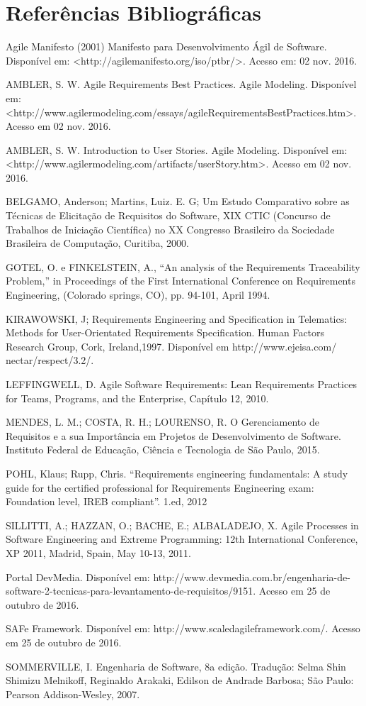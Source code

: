 \chapter[Referências Bibliográficas]{Referências Bibliográficas}

Agile Manifesto (2001) Manifesto para Desenvolvimento Ágil de Software. Disponível em: <http://agilemanifesto.org/iso/ptbr/>. Acesso em: 02 nov. 2016.

AMBLER, S. W. Agile Requirements Best Practices. Agile Modeling. Disponível em: <http://www.agilermodeling.com/essays/agileRequirementsBestPractices.htm>. Acesso em 02 nov. 2016.

AMBLER, S. W. Introduction to User Stories. Agile Modeling. Disponível em: <http://www.agilermodeling.com/artifacts/userStory.htm>. Acesso em 02 nov. 2016.

BELGAMO, Anderson; Martins, Luiz. E. G; Um Estudo Comparativo sobre as Técnicas de Elicitação de Requisitos do Software, XIX CTIC (Concurso de Trabalhos de Iniciação Científica) no XX Congresso Brasileiro da Sociedade Brasileira de Computação, Curitiba, 2000.

GOTEL, O. e FINKELSTEIN, A., “An analysis of the Requirements Traceability Problem,” in Proceedings of the First International Conference on Requirements Engineering, (Colorado springs, CO), pp. 94-101, April 1994.

KIRAWOWSKI, J; Requirements Engineering and Specification in Telematics: Methods for User-Orientated Requirements Specification. Human Factors Research Group, Cork, Ireland,1997. Disponível em http://www.ejeisa.com/ nectar/respect/3.2/. 

LEFFINGWELL, D. Agile Software Requirements: Lean Requirements Practices for Teams, Programs, and the Enterprise, Capítulo 12, 2010.

MENDES, L. M.; COSTA, R. H.; LOURENSO, R. O Gerenciamento de Requisitos e a sua Importância em Projetos de Desenvolvimento de Software. Instituto Federal de Educação, Ciência e Tecnologia de São Paulo, 2015.			

POHL, Klaus; Rupp, Chris. “Requirements engineering fundamentals: A study guide for the certified professional for Requirements Engineering exam: Foundation level, IREB compliant”. 1.ed, 2012 

SILLITTI, A.; HAZZAN, O.; BACHE, E.; ALBALADEJO, X. Agile Processes in Software Engineering and Extreme Programming: 12th International Conference, XP 2011, Madrid, Spain, May 10-13, 2011.

Portal DevMedia. Disponível em: http://www.devmedia.com.br/engenharia-de-software-2-tecnicas-para-levantamento-de-requisitos/9151. Acesso em 25 de outubro de 2016.

SAFe Framework. Disponível em: http://www.scaledagileframework.com/. Acesso em 25 de outubro de 2016.

SOMMERVILLE, I. Engenharia de Software, 8a edição. Tradução: Selma Shin Shimizu Melnikoff, Reginaldo Arakaki, Edilson de Andrade Barbosa; São Paulo: Pearson Addison-Wesley, 2007.
